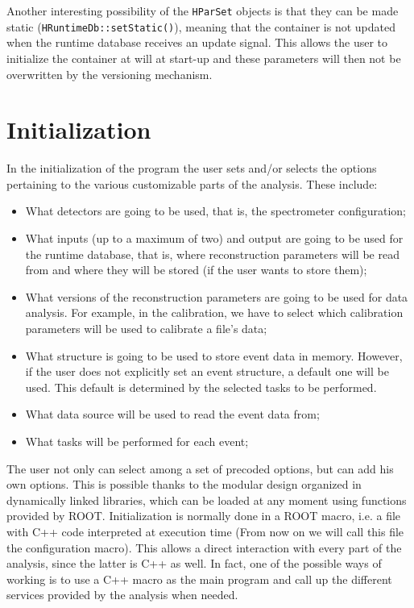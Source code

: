 Another interesting possibility of the \verb+HParSet+ objects is that they can 
be made static 
\newline
(\verb+HRuntimeDb::setStatic()+), meaning that the container is 
not updated when the runtime database receives an update signal. This allows the 
user to initialize the container at will at start-up and these parameters will 
then not be overwritten by the versioning mechanism. 

\section{Initialization}\label{Chapter_init}

In the initialization of the program the user sets and/or selects the options 
pertaining to the various customizable parts of the analysis. These include:
\begin{itemize}
    \item What detectors are going to be used, that is, the spectrometer configuration;
    \item What inputs (up to a maximum of two) and output are going to be used for 
    the runtime database, that is, where reconstruction parameters will be read from 
    and where they will be stored (if the user wants to store them);
    \item What versions of the reconstruction parameters are going to be used for 
    data analysis. For example, in the calibration, we have to select which calibration 
    parameters will be used to calibrate a file's data;
    \item What structure is going to be used to store event data in memory. However, 
    if the user does not explicitly set an event structure, a default one will be used. 
    This default is determined by the selected tasks to be performed.
    \item What data source will be used to read the event data from;
    \item  What tasks will be performed for each event;
\end{itemize}

The user not only can select among a set of precoded options, but can add his own options. 
This is possible thanks to the modular design organized in dynamically linked libraries, 
which can be loaded at any moment using functions provided by ROOT.
Initialization is normally done in a ROOT macro, i.e. a file with C++ code interpreted 
at execution time (From now on we will call this file the configuration macro). This 
allows a direct interaction with every part of the analysis, since the latter is C++ 
as well. In fact, one of the possible ways of working is to use a C++ macro as the 
main program and call up the different services provided by the analysis when needed.

